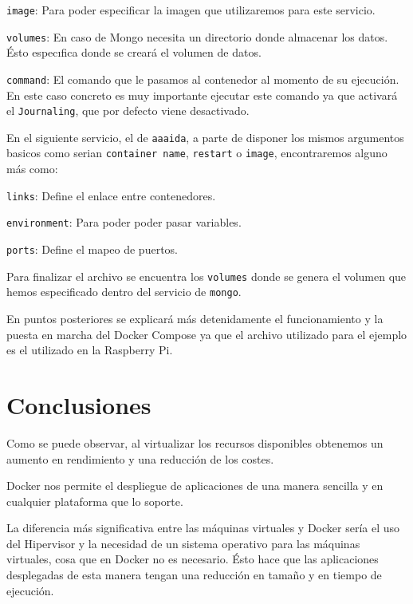 \texttt{image}: Para poder especificar la imagen que utilizaremos para este servicio.

\texttt{volumes}: En caso de Mongo necesita un directorio donde almacenar los datos. Ésto especıfica donde se creará el volumen de datos.

\texttt{command}:  El comando que le pasamos al contenedor al momento de su ejecución. En este caso concreto es muy importante ejecutar este comando ya que activará el \texttt{Journaling}, que por defecto viene desactivado.

En el siguiente servicio, el de \texttt{aaaida}, a parte de disponer los mismos argumentos basicos como serian \texttt{container name}, \texttt{restart} o \texttt{image}, encontraremos alguno más como:

\texttt{links}: Define el enlace entre contenedores.

\texttt{environment}: Para poder poder pasar variables.

\texttt{ports}: Define el mapeo de puertos.

Para finalizar el archivo se encuentra los \texttt{volumes} donde se genera el volumen que hemos especificado dentro del servicio de \texttt{mongo}.  

En puntos posteriores se explicará más detenidamente el funcionamiento y la puesta en marcha del Docker Compose ya que el archivo utilizado para el ejemplo es el utilizado en la Raspberry Pi.

\section{Conclusiones}

Como se puede observar, al virtualizar los recursos disponibles obtenemos un aumento en rendimiento y una reducción de los costes. 

Docker nos permite el despliegue de aplicaciones de una manera sencilla y en cualquier plataforma que lo soporte. 

La diferencia más significativa entre las máquinas virtuales y Docker sería el uso del Hipervisor y la necesidad de un sistema operativo para las máquinas virtuales, cosa que en Docker no es necesario. Ésto hace que las aplicaciones desplegadas de esta manera tengan una reducción en tamaño y en tiempo de ejecución.
